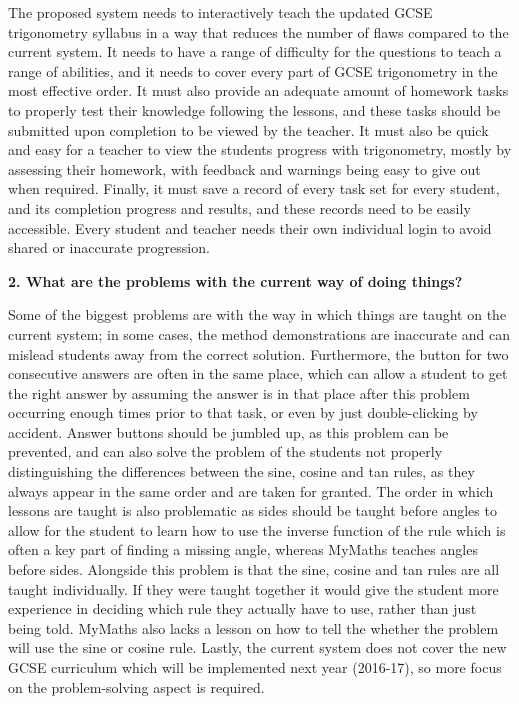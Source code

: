 The proposed system needs to interactively teach the updated GCSE trigonometry syllabus in a way that reduces the number of flaws compared to the current system. It needs to have a range of difficulty for the questions to teach a range of abilities, and it needs to cover every part of GCSE trigonometry in the most effective order. It must also provide an adequate amount of homework tasks to properly test their knowledge following the lessons, and these tasks should be submitted upon completion to be viewed by the teacher. It must also be quick and easy for a teacher to view the students progress with trigonometry, mostly by assessing their homework, with feedback and warnings being easy to give out when required. Finally, it must save a record of every task set for every student, and its completion progress and results, and these records need to be easily accessible. Every student and teacher needs their own individual login to avoid shared or inaccurate progression.

\textbf{2. What are the problems with the current way of doing things?}

Some of the biggest problems are with the way in which things are taught on the current system; in some cases, the method demonstrations are inaccurate and can mislead students away from the correct solution. Furthermore, the button for two consecutive answers are often in the same place, which can allow a student to get the right answer by assuming the answer is in that place after this problem occurring enough times prior to that task, or even by just double-clicking by accident. Answer buttons should be jumbled up, as this problem can be prevented, and can also solve the problem of the students not properly distinguishing the differences between the sine, cosine and tan rules, as they always appear in the same order and are taken for granted. The order in which lessons are taught is also problematic as sides should be taught before angles to allow for the student to learn how to use the inverse function of the rule which is often a key part of finding a missing angle, whereas MyMaths teaches angles before sides. Alongside this problem is that the sine, cosine and tan rules are all taught individually. If they were taught together it would give the student more experience in deciding which rule they actually have to use, rather than just being told. MyMaths also lacks a lesson on how to tell the whether the problem will use the sine or cosine rule. Lastly, the current system does not cover the new GCSE curriculum which will be implemented next year (2016-17), so more focus on the problem-solving aspect is required.


